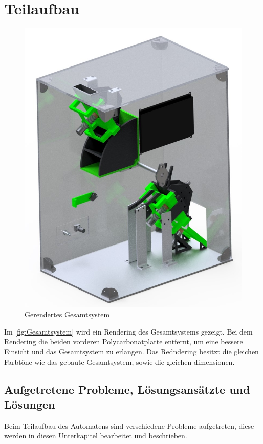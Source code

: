 \section{Teilaufbau}
\begin{figure}[H]
    \centering
    \includegraphics[scale=0.7,page=1]{fig/mech/ReShuffledCombined}
    \caption{Gerendertes Gesamtsystem}
    \label{fig:Gesamtsystem}
\end{figure}

Im \autoref{fig:Gesamtsystem} wird ein Rendering des Gesamtsystems gezeigt. Bei dem
Rendering die beiden vorderen Polycarbonatplatte entfernt, um eine bessere Einsicht und
das Gesamtsystem zu erlangen. Das Redndering besitzt die gleichen Farbtöne wie das gebaute
Gesamtsystem, sowie die gleichen dimensionen.

\subsection{Aufgetretene Probleme, Lösungsansätzte und Lösungen}
Beim Teilaufbau des Automatens sind verschiedene Probleme aufgetreten, diese werden in diesen Unterkapitel bearbeitet und beschrieben.

